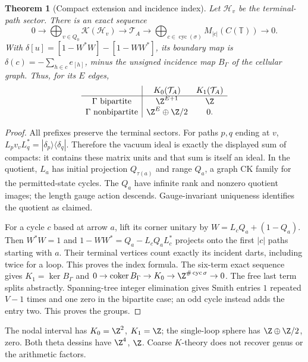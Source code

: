 \documentclass[11pt]{article}
\newtheorem{theorem}{Theorem}[section]
\theoremstyle{definition}\newtheorem{definition}[theorem]{Definition}
\theoremstyle{remark}\newtheorem{remark}[theorem]{Remark}
\begin{document}
\begin{theorem}[Compact extension and incidence index]\label{thm:fock}
Let $\mathcal H_v$ be the terminal-path sector. There is an exact sequence
\[
 0\longrightarrow\bigoplus_{v\in Q_0}\mathcal K(\mathcal H_v)
 \longrightarrow\mathcal T_A\longrightarrow
 \bigoplus_{c\in\operatorname{cyc}(\sigma)}M_{|c|}(C(\mathbb T))\longrightarrow0.
\]
With $\delta[u]=[1-W^*W]-[1-WW^*]$, its boundary map is
$\delta(c)=-\sum_{h\in c}e_{[h]}$, minus the unsigned incidence map $B_\Gamma$ of the cellular graph. Thus, for its $E$ edges,
\[
\begin{array}{c|cc}
 &K_0(\mathcal T_A)&K_1(\mathcal T_A)\\\hline
\Gamma\text{ bipartite}&\Z^{E+1}&\Z\\
\Gamma\text{ nonbipartite}&\Z^E\oplus\Z/2&0.
\end{array}
\]
\end{theorem}
\begin{proof}
All prefixes preserve the terminal sectors. For paths $p,q$ ending at $v$, $L_pv_vL_q^*=|\delta_p\rangle\langle\delta_q|$. Therefore the vacuum ideal is exactly the displayed sum of compacts: it contains these matrix units and that sum is itself an ideal. In the quotient, $L_a$ has initial projection $Q_{\tau(a)}$ and range $Q_a$, a graph CK family for the permitted-state cycles. The $Q_a$ have infinite rank and nonzero quotient images; the length gauge action descends. Gauge-invariant uniqueness \cite[Theorem2.1]{BPRS} identifies the quotient as claimed.

For a cycle $c$ based at arrow $a$, lift its corner unitary by $W=L_cQ_a+(1-Q_a)$. Then $W^*W=1$ and $1-WW^*=Q_a-L_cQ_aL_c^*$ projects onto the first $|c|$ paths starting with $a$. Their terminal vertices count exactly its incident darts, including twice for a loop. This proves the index formula. The six-term exact sequence gives $K_1=\ker B_\Gamma$ and $0\to\operatorname{coker}B_\Gamma\to K_0\to\Z^{\#\operatorname{cyc}\sigma}\to0$. The free last term splits abstractly. Spanning-tree integer elimination gives Smith entries $1$ repeated $V-1$ times and one zero in the bipartite case; an odd cycle instead adds the entry two. This proves the groups.
\end{proof}
The nodal interval has $K_0=\Z^2$, $K_1=\Z$; the single-loop sphere has $\Z\oplus\Z/2$, zero. Both theta dessins have $\Z^4$, $\Z$. Coarse $K$-theory does not recover genus or the arithmetic factors.
\end{document}
